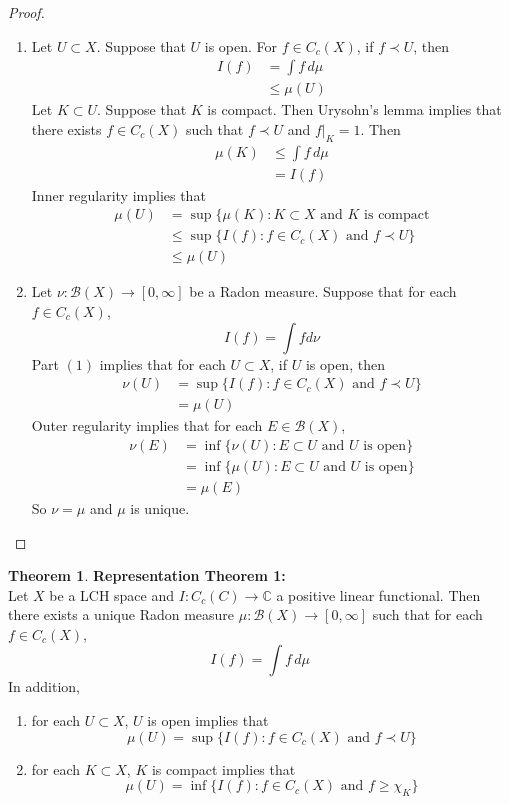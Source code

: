 \documentclass[12pt]{amsart}
\theoremstyle{definition}
\newtheorem{thm}[definition]{Theorem}
\newcommand{\C}{\mathbb{C}}
\newcommand{\MB}{\mathcal{B}}
\newcommand{\dmu}{\, d \mu}
\newcommand{\RG}{[0,\infty]}
\begin{document}
	\begin{proof}\
	\begin{enumerate}
	\item Let $U \subset X$. Suppose that $U$ is open. For $f \in C_c(X)$, if $f \prec U$, then 
	\begin{align*}
	I(f) 
	&= \int f \dmu \\
	& \leq \mu(U) 
	\end{align*}
	Let $K \subset U$. Suppose that $K$ is compact. Then Urysohn's lemma implies that there exists $f \in C_c(X)$ such that $f \prec U$ and $f|_K = 1$. Then 
	\begin{align*}
	\mu(K) 
	&\leq \int f \dmu \\
	&= I(f)
	\end{align*}
	Inner regularity implies that 
	\begin{align*}
	\mu(U) 
	&= \sup \{\mu(K): K \subset X \text{ and $K$ is compact} \\
	& \leq \sup \{I(f): f \in C_c(X) \text{ and } f \prec U \} \\
	&\leq \mu(U)
	\end{align*}
	\item Let $\nu: \MB(X) \rightarrow \RG$ be a Radon measure. Suppose that for each $f \in C_c(X)$, $$I(f) = \int f d\nu$$
	Part $(1)$ implies that for each $U \subset X$, if $U$ is open, then 
	\begin{align*}
	\nu(U) 
	&= \sup \{I(f): f \in C_c(X) \text{ and } f \prec U \} \\
	&= \mu(U)
\end{align*}		
	Outer regularity implies that for each $E \in \MB(X)$, 
	\begin{align*}
	\nu(E) 
	&= \inf \{\nu(U): E \subset U \text{ and $U$ is open}\} \\
	&= \inf \{\mu(U): E \subset U \text{ and $U$ is open}\} \\
	&= \mu(E)
	\end{align*}
	So $\nu = \mu$ and $\mu$ is unique.
\end{enumerate}		  
	\end{proof}
	
	\begin{thm}\textbf{Representation Theorem 1:}\\
	Let $X$ be a LCH space and $I: C_c(C) \rightarrow \C$ a positive linear functional. Then there exists a unique Radon measure $\mu:\MB(X) \rightarrow \RG$ such that for each $f \in C_c(X)$, $$I(f) = \int f \dmu$$ 
	In addition, 
	\begin{enumerate}
	\item for each $U \subset X$, $U$ is open implies that $$\mu(U) = \sup \{I(f): f \in C_c(X) \text{ and } f \prec U \}$$
	\item for each $K \subset X$, $K$ is compact implies that $$\mu(U) = \inf \{I(f): f \in C_c(X) \text{ and } f  \geq \chi_K \}$$
\end{enumerate}	 
	\end{thm}
	
\end{document}
